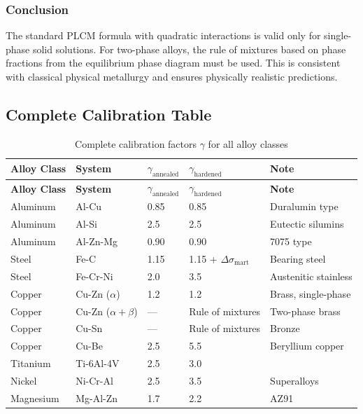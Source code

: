 \documentclass[12pt,a4paper]{article}
\begin{document}
	\subsubsection{Conclusion}
	
	The standard PLCM formula with quadratic interactions is valid only for single-phase solid solutions. For two-phase alloys, the rule of mixtures based on phase fractions from the equilibrium phase diagram must be used. This is consistent with classical physical metallurgy and ensures physically realistic predictions.
	
	\subsection{Complete Calibration Table}
	\label{subsec:complete-calibration}
	
	\begin{longtable}{p{3cm}p{2.5cm}p{2.5cm}p{2.5cm}p{4cm}}
		\caption{Complete calibration factors \(\gamma\) for all alloy classes} \label{tab:complete-gamma} \\
		\toprule
		\textbf{Alloy Class} & \textbf{System} & \(\gamma_{\text{annealed}}\) & \(\gamma_{\text{hardened}}\) & \textbf{Note} \\
		\midrule
		\endfirsthead
		\toprule
		\textbf{Alloy Class} & \textbf{System} & \(\gamma_{\text{annealed}}\) & \(\gamma_{\text{hardened}}\) & \textbf{Note} \\
		\midrule
		\endhead
		Aluminum & Al-Cu & 0.85 & 0.85 & Duralumin type \\
		Aluminum & Al-Si & 2.5 & 2.5 & Eutectic silumins \\
		Aluminum & Al-Zn-Mg & 0.90 & 0.90 & 7075 type \\
		Steel & Fe-C & 1.15 & 1.15 + \(\Delta\sigma_{\text{mart}}\) & Bearing steel \\
		Steel & Fe-Cr-Ni & 2.0 & 3.5 & Austenitic stainless \\
		Copper & Cu-Zn (\(\alpha\)) & 1.2 & 1.2 & Brass, single-phase \\
		Copper & Cu-Zn (\(\alpha+\beta\)) & — & Rule of mixtures & Two-phase brass \\
		Copper & Cu-Sn & — & Rule of mixtures & Bronze \\
		Copper & Cu-Be & 2.5 & 5.5 & Beryllium copper \\
		Titanium & Ti-6Al-4V & 2.5 & 3.0 & \\
		Nickel & Ni-Cr-Al & 2.5 & 3.5 & Superalloys \\
		Magnesium & Mg-Al-Zn & 1.7 & 2.2 & AZ91 \\
		\bottomrule
	\end{longtable}
	
\end{document}
